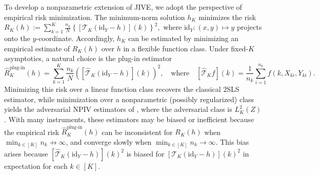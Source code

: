 \documentclass[11pt]{article}
\theoremstyle{plain}
\theoremstyle{definition}
\theoremstyle{remark}
\theoremstyle{definition}
\begin{document}
To develop a nonparametric extension of JIVE, we adopt the perspective of empirical risk minimization.  The minimum-norm solution \(h_K\) minimizes the risk  $R_K(h) := \sum_{k=1}^K \frac{n_k}{N} \left\{[\mathcal{T}_K(\mathrm{id}_Y - h)](k)\right\}^2,$
where \(\mathrm{id}_Y:(x,y)\mapsto y\) projects onto the \(y\)-coordinate. 
Accordingly, \(h_K\) can be estimated by minimizing an empirical estimate of \(R_K(h)\) over \(h\) in a flexible function class. Under fixed-\(K\) asymptotics, a natural choice is the plug-in estimator
\[
\widehat{R}_K^{\text{plug-in}}(h)
  = \sum_{k=1}^{K} \frac{n_k}{N} 
    \left([\widehat{\mathcal{T}}_K(\mathrm{id}_Y - h)](k)\right)^2,
  \quad \text{where} \quad 
  [\widehat{\mathcal{T}}_K f](k)
  = \frac{1}{n_k} \sum_{i=1}^{n_k} f(k, X_{ki}, Y_{ki}).
\]
Minimizing this risk over a linear function class recovers the classical 2SLS estimator, while minimization over a nonparametric (possibly regularized) class yields the adversarial NPIV estimators of \citet{dikkala2020minimax, bennett2019deep, bennett2023inference, bennett2023variational}, where the adversarial class is \(L^2_K(Z)\). With many instruments, these estimators may be biased or inefficient because the empirical risk \(\widehat{R}_K^{\text{plug-in}}(h)\) can be inconsistent for \(R_K(h)\) when \(\min_{k \in [K]} n_k \not\to \infty\), and converge slowly when \(\min_{k \in [K]} n_k \to \infty\). 
This bias arises because \([\widehat{\mathcal{T}}_K(\mathrm{id}_Y - h)](k)^2\) is biased for \([\mathcal{T}_K(\mathrm{id}_Y - h)](k)^2\) in expectation for each \(k \in [K]\).

 





 
 
\end{document}
